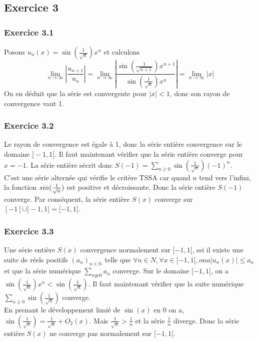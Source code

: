 \documentclass[]{book}
\theoremstyle{definition}
\newcommand{\bb}[1]{\mathbb{#1}}
\newcommand{\N}{\bb{N}}
\begin{document}
\subsection*{Exercice 3}
\subsubsection*{Exercice 3.1}
Posons $u_n(x) = \sin(\frac{1}{\sqrt{n}})x^n$ et calculons
$$
\lim_{n \to \infty} \left\lvert \frac{u_{n+1}}{u_n} \right\rvert =  \lim_{n \to \infty} \left\lvert \frac{\sin(\frac{1}{\sqrt{n+1}})x^{n+1}}{\sin(\frac{1}{\sqrt{n}})x^n} \right\rvert = \lim_{n \to \infty} \lvert x \rvert
$$
On en d\'eduit que la s\'erie est convergente pour $\lvert x \rvert < 1$, donc son rayon de convergence vaut 1.

\subsubsection*{Exercice 3.2}
Le rayon de convergence est \'egale \`a 1, donc la s\'erie enti\`ere convergence sur le domaine $]-1, 1[$. Il faut maintenant v\'erifier que la s\'erie enti\`ere converge pour $x = -1$. La s\'erie enti\`ere s\'ecrit donc $S(-1) = \sum_{n \ge 0} \sin(\frac{1}{\sqrt{n}})(-1)^n$.\\
C'est une s\'erie altern\'ee qui v\'erifie le crit\`ere TSSA car quand $n$ tend vers l'infini, la fonction $\\sin(\frac{1}{\sqrt{n}})$ est positive et d\'ecroissante. Donc la s\'erie enti\`ere $S(-1)$ converge. Par cons\'equent, la s\'erie enti\`ere $S(x)$ converge sur $[-1] \cup ]-1, 1[ = [-1, 1[$.

\subsubsection*{Exercice 3.3}
Une s\'erie enti\`ere $S(x)$ convergence normalement sur $[-1,1[$, ssi il existe une suite de r\'eels positifs 	$(a_n)_{n \in \N}$ telle que $\forall n \in N, \forall x \in [-1,1[, on a \lvert u_n(x) \rvert 	\le a_n$ et que la s\'erie num\'erique $\sum_{n ge 0}a_n$ converge. Sur le domaine $[-1,1[$, on a $\sin(\frac{1}{\sqrt{n}})x^n < \sin(\frac{1}{\sqrt{n}})$. Il faut maintenant v\'erifier que la suite num\'erique $\sum_{n \ge 0}{\sin(\frac{1}{\sqrt{n}})}$ converge. \\
En prenant le d\'eveloppement limi\'e de $\sin(x)$ en 0 on a, $\sin(\frac{1}{\sqrt{n}}) = \frac{1}{\sqrt{n}} + O_2(x)$. Mais $\frac{1}{\sqrt{n}} > \frac{1}{n}$ et la s\'erie $\frac{1}{n}$ diverge. Donc la s\'erie enti\`ere $S(x)$ ne converge pas normalement sur $[-1,1[$.
\end{document}
